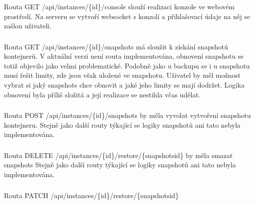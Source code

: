 \documentclass[a4paper,oneside,12pt]{report}
\begin{document}
\subsubsection{}

Routa GET /api/instances/\{id\}/console slouží realizaci konzole ve webovém prostředí.
Na serveru se vytvoří websocket s konzolí a přihlašovací údaje na něj se zašlou uživateli.

\subsubsection{}

Routa GET /api/instances/\{id\}/snapshots má sloužit k získání snapshotů kontejnerů.
V aktuální verzi není routa implementována, obnovení snapshotu se totiž objevilo jako velmi problematické.
Podobně jako u backupu se i u snapshotu musí řešit limity, zde jsou však uložené ve snapshotu.
Uživatel by měl možnost vybrat si jaký snapshots chce obnovit a jaké jeho limity se mají dodržet.
Logika obnovení byla příliš složitá a její realizace se nestihla včas udělat.


\subsubsection{}

Routa POST /api/instances/\{id\}/snapshots by měla vyvolat vytvoření snapshotu kontejneru.
Stejně jako další routy týkající se logiky snapshotů ani tato nebyla implementována.

\subsubsection{}

Routa DELETE /api/instances/\{id\}/restore/\{snapshotsid\} by měla smazat snapshots
Stejně jako další routy týkající se logiky snapshotů ani tato nebyla implementována.

\subsubsection{}

Routa PATCH /api/instances/\{id\}/restore/\{snapshotsid\}
\end{document}
